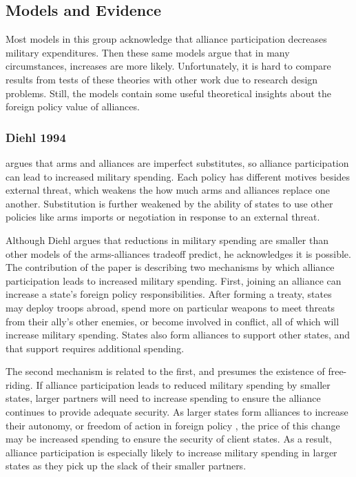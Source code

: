 \documentclass[12pt]{article}
\begin{document}
\subsection{Models and Evidence} 


Most models in this group acknowledge that alliance participation decreases military expenditures.
Then these same models argue that in many circumstances, increases are more likely. 
Unfortunately, it is hard to compare results from tests of these theories with other work due to research design problems. 
Still, the models contain some useful theoretical insights about the foreign policy value of alliances. 


\subsubsection{Diehl 1994}


\citet{Diehl1994} argues that arms and alliances are imperfect substitutes, so alliance participation can lead to increased military spending. 
Each policy has different motives besides external threat, which weakens the how much arms and alliances replace one another.
Substitution is further weakened by the ability of states to use other policies like arms imports or negotiation in response to an external threat. 


Although Diehl argues that reductions in military spending are smaller than other models of the arms-alliances tradeoff predict, he acknowledges it is possible.
The contribution of the paper is describing two mechanisms by which alliance participation leads to increased military spending. 
First, joining an alliance can increase a state's foreign policy responsibilities. 
After forming a treaty, states may deploy troops abroad, spend more on particular weapons to meet threats from their ally's other enemies, or become involved in conflict, all of which will increase military spending. 
States also form alliances to support other states, and that support requires additional spending. 

The second mechanism is related to the first, and presumes the existence of free-riding. 
If alliance participation leads to reduced military spending by smaller states, larger partners will need to increase spending to ensure the alliance continues to provide adequate security. 
As larger states form alliances to increase their autonomy, or freedom of action in foreign policy \citep{Morrow1991}, the price of this change may be increased spending to ensure the security of client states. 
As a result, alliance participation is especially likely to increase military spending in larger states as they pick up the slack of their smaller partners. 
\end{document}
